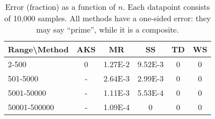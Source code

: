 \begin{table}
\centering
\caption{Error (fraction) as a function of $n$. Each datapoint consists of 10,000 samples. All methods have a one-sided error: they may say ``prime'', while it is a composite.}
\begin{tabular}{|l|c|c|c|c|c|} \hline
Range\textbackslash Method&AKS&MR&SS&TD&WS \\ \hline
2-500&0&1.27E-2&9.52E-3&0&0 \\ \hline
501-5000&-&2.64E-3&2.99E-3&0&0 \\ \hline
5001-50000&-&1.11E-3&5.53E-4&0&0 \\ \hline
50001-500000&-&1.09E-4&0&0&0 \\ \hline
\end{tabular}
\label{tab:pressure}
\end{table}

